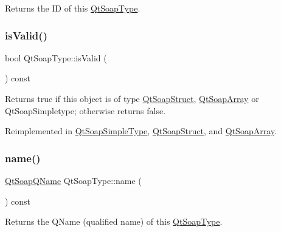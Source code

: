 Returns the ID of this \mbox{\hyperlink{class_qt_soap_type}{Qt\+Soap\+Type}}. \mbox{\label{class_qt_soap_type_a3b659f89a768ca3503fc86086bb987f6}} 
\subsubsection{\texorpdfstring{is\+Valid()}{isValid()}}
{\footnotesize\ttfamily bool Qt\+Soap\+Type\+::is\+Valid (\begin{DoxyParamCaption}{ }\end{DoxyParamCaption}) const\hspace{0.3cm}{\ttfamily [virtual]}}

Returns true if this object is of type \mbox{\hyperlink{class_qt_soap_struct}{Qt\+Soap\+Struct}}, \mbox{\hyperlink{class_qt_soap_array}{Qt\+Soap\+Array}} or Qt\+Soap\+Simpletype; otherwise returns false. 

Reimplemented in \mbox{\hyperlink{class_qt_soap_simple_type_aa02758d143c6027bc15a2712e241795c}{Qt\+Soap\+Simple\+Type}}, \mbox{\hyperlink{class_qt_soap_struct_a6331af5d1dc99b8ed528c26a834d961f}{Qt\+Soap\+Struct}}, and \mbox{\hyperlink{class_qt_soap_array_ac74c2b02dd640d9a39dc963753aa10a2}{Qt\+Soap\+Array}}.

\mbox{\label{class_qt_soap_type_a6d5fb3d1ea4cf6d1432c7f62a5da09c3}} 
\subsubsection{\texorpdfstring{name()}{name()}}
{\footnotesize\ttfamily \mbox{\hyperlink{class_qt_soap_q_name}{Qt\+Soap\+Q\+Name}} Qt\+Soap\+Type\+::name (\begin{DoxyParamCaption}{ }\end{DoxyParamCaption}) const\hspace{0.3cm}{\ttfamily [virtual]}}

Returns the Q\+Name (qualified name) of this \mbox{\hyperlink{class_qt_soap_type}{Qt\+Soap\+Type}}. \mbox{\label{class_qt_soap_type_a50fc7724b6261d6428cef2062b21bad7}} 
